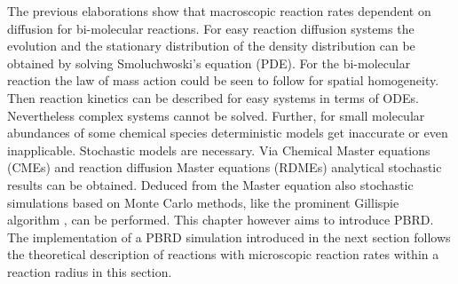 \documentclass[
  a4paper,BCOR10mm,oneside,
  headsepline,footsepline,%
  fleqn,openbib
]{scrbook}
\begin{document}
The previous elaborations show that macroscopic reaction rates dependent on diffusion for bi-molecular reactions. For easy reaction diffusion systems the evolution and the stationary distribution of the density distribution can be obtained by solving Smoluchwoski's equation (PDE). For the bi-molecular reaction the law of mass action could be seen to follow for spatial homogeneity. Then reaction kinetics can be described for easy systems in terms of ODEs. Nevertheless complex systems cannot be solved. Further, for small molecular abundances of some chemical species deterministic models get inaccurate or even inapplicable. Stochastic models are necessary. Via Chemical Master equations (CMEs) and reaction diffusion Master equations (RDMEs) analytical stochastic results can be obtained. Deduced from the Master equation also stochastic simulations based on Monte Carlo methods, like the prominent Gillispie algorithm \cite{Gillespie1977}, can be performed. This chapter however aims to introduce PBRD. The implementation of a PBRD simulation introduced in the next section follows the theoretical description of reactions with microscopic reaction rates within a reaction radius in this section.
% 
% 
% 
% 
% 
% 
% 
% 
% 
% 
% 
% 
% 
% 
% 
\end{document}
